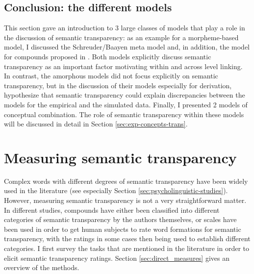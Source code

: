 \subsection{Conclusion: the different models}

This section gave an introduction to 3 large classes of models
that play a role in the discussion of semantic transparency: as an
example for a morpheme-based model, I discussed the Schreuder/Baayen
meta model and, in addition, the model for compounds proposed in
\citet{Libben:1998}. Both models explicitly discuss semantic
transparency as an important factor motivating within and across
level linking. In contrast, the amorphous models did not focus
explicitly on semantic transparency, but in the discussion of their
models especially for derivation, \citet{Baayenetal:2011} hypothesize
that semantic transparency could explain discrepancies between the
models for the
empirical and the simulated data. Finally, I presented 2 models of conceptual combination. The role of semantic
transparency within these models will be
discussed in detail in Section \ref{sec:exp-concepts-trans}.




\section{Measuring semantic transparency}
\label{sec:measuringST}
Complex words with different degrees of semantic transparency have been wide\-ly
used in the literature (see especially Section
\ref{sec:psycholinguistic-studies}). However, measuring semantic transparency is not a very straightforward
matter. In different studies, compounds have either been classified into
different categories of semantic transparency by the authors themselves, or scales have
been used in order to get human subjects to rate word formations for
semantic transparency, with the ratings in some cases then being used to
establish different categories. I first survey the tasks that are
mentioned in the literature in order to elicit semantic transparency
ratings. Section \ref{sec:direct_measures} gives an overview of the
methods.

